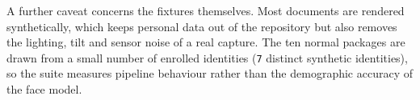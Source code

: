 A further caveat concerns the fixtures themselves. Most documents are rendered
synthetically, which keeps personal data out of the repository but also removes
the lighting, tilt and sensor noise of a real capture. The ten normal packages
are drawn from a small number of enrolled identities
(\texttt{7} distinct synthetic identities), so the suite measures pipeline
behaviour rather than the demographic accuracy of the face model.

